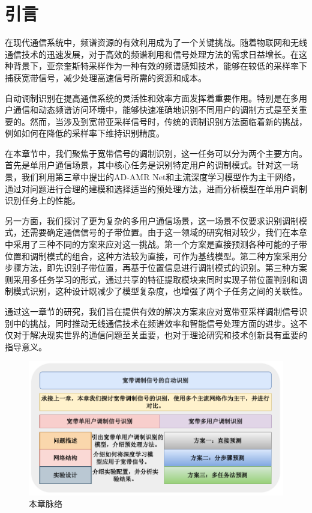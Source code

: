 \section{引言}\label{sec:background}

在现代通信系统中，频谱资源的有效利用成为了一个关键挑战。随着物联网和无线通信技术的迅速发展，对于高效的频谱利用和信号处理方法的需求日益增长。在这种背景下，亚奈奎斯特采样作为一种有效的频谱感知技术，能够在较低的采样率下捕获宽带信号，减少处理高速信号所需的资源和成本。

自动调制识别在提高通信系统的灵活性和效率方面发挥着重要作用。特别是在多用户通信和动态频谱访问环境中，能够快速准确地识别不同用户的调制方式是至关重要的。然而，当涉及到宽带亚采样信号时，传统的调制识别方法面临着新的挑战，例如如何在降低的采样率下维持识别精度。

在本章节中，我们聚焦于宽带信号的调制识别，这一任务可以分为两个主要方向。首先是单用户通信场景，其中核心任务是识别特定用户的调制模式。针对这一场景，我们利用第三章中提出的AD-AMR Net和主流深度学习模型作为主干网络，通过对问题进行合理的建模和选择适当的预处理方法，进而分析模型在单用户调制识别任务上的性能。

另一方面，我们探讨了更为复杂的多用户通信场景，这一场景不仅要求识别调制模式，还需要确定通信信号的子带位置。由于这一领域的研究相对较少，我们在本章中采用了三种不同的方案来应对这一挑战。第一个方案是直接预测各种可能的子带位置和调制模式的组合，这种方法较为直接，可作为基线模型。第二种方案采用分步骤方法，即先识别子带位置，再基于位置信息进行调制模式的识别。第三种方案则采用多任务学习的形式，通过共享的特征提取模块来同时实现子带位置判别和调制模式识别，这种设计既减少了模型复杂度，也增强了两个子任务之间的关联性。

通过这一章节的研究，我们旨在提供有效的解决方案来应对宽带亚采样调制信号识别中的挑战，同时推动无线通信技术在频谱效率和智能信号处理方面的进步。这不仅对于解决现实世界的通信问题至关重要，也对于理论研究和技术创新具有重要的指导意义。

\begin{figure}
    \centering
    \includegraphics[width=\textwidth]{Image/chap4_map.pdf}
    \caption{本章脉络}
    \label{fig:chap4_overview}
\end{figure}

